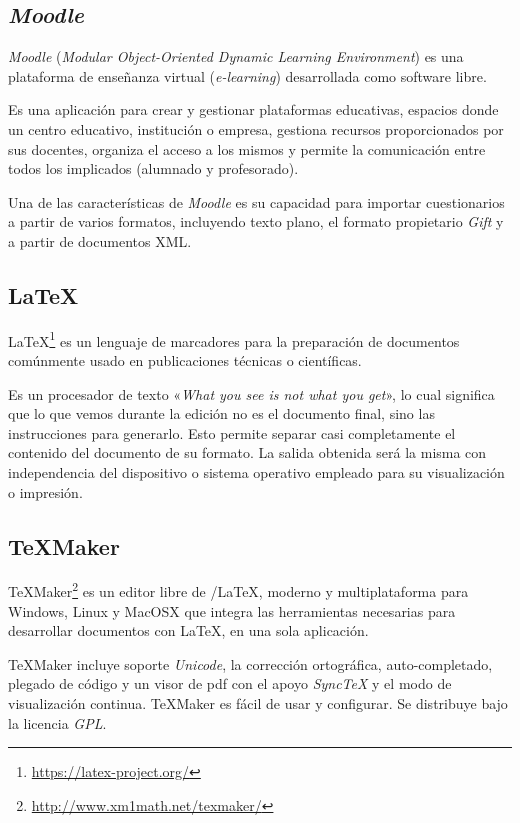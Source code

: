\subsection{\textit{Moodle}}
\textit{Moodle} (\emph{Modular Object-Oriented Dynamic Learning Environment}) es una plataforma de enseñanza virtual (\emph{e-learning}) desarrollada como software libre.

Es una aplicación para crear y gestionar plataformas educativas, espacios donde un centro educativo, institución o empresa, gestiona recursos proporcionados por sus docentes, organiza el acceso a los mismos y permite la comunicación entre todos los implicados (alumnado y profesorado).

Una de las características de \textit{Moodle} es su capacidad para importar cuestionarios a partir de varios formatos, incluyendo texto plano, el formato propietario \textit{Gift} y a partir de documentos XML.

\subsection{\LaTeX{}}
\LaTeX{}\footnote{\url{https://latex-project.org/}} es un lenguaje de marcadores para la preparación de documentos comúnmente usado en publicaciones técnicas o científicas.

Es un procesador de texto «\emph{What you see is not what you get}», lo cual significa que lo que vemos durante la edición no es el documento final, sino las instrucciones para generarlo.
Esto permite separar casi completamente el contenido del documento de su formato. La salida obtenida será la misma con independencia del dispositivo o sistema operativo empleado para su visualización o impresión.

\subsection{\TeX{}Maker}
\TeX{}Maker\footnote{\url{http://www.xm1math.net/texmaker/}} es un editor libre de /\LaTeX{}, moderno y multiplataforma para Windows, Linux y MacOSX que integra las herramientas necesarias para desarrollar documentos con \LaTeX{}, en una sola aplicación.

\TeX{}Maker incluye soporte \textit{Unicode}, la corrección ortográfica, auto-completado, plegado de código y un visor de pdf con el apoyo \textit{SyncTeX} y el modo de visualización continua. \TeX{}Maker es fácil de usar y configurar. Se distribuye bajo la licencia \textit{GPL}.

